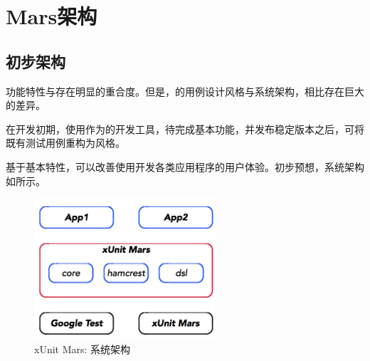 \section{Mars架构}
	
\begin{content}

\subsection{初步架构}

功能特性与存在明显的重合度。但是，的用例设计风格与系统架构，相比存在巨大的差异。

在开发初期，使用作为的开发工具，待完成基本功能，并发布稳定版本之后，可将既有测试用例重构为风格。

基于基本特性，可以改善使用开发各类应用程序的用户体验。初步预想，系统架构如所示。

\begin{figure}[H]
\centering
\includegraphics[width=0.6\textwidth]{figures/xunit/framework.png}
\caption{xUnit Mars: 系统架构}
 \label{fig:mars-framework}
\end{figure}

\end{content}
